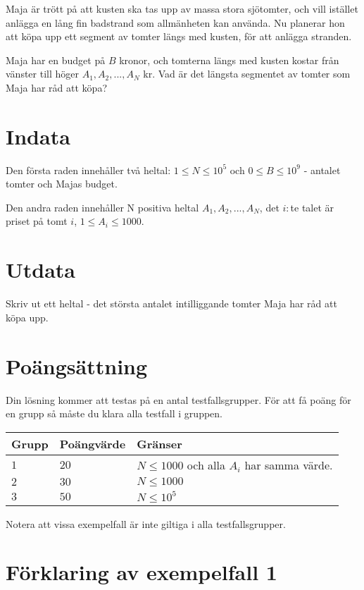 Maja är trött på att kusten ska tas upp av massa stora sjötomter, och vill istället anlägga en lång fin badstrand som allmänheten kan använda.
Nu planerar hon att köpa upp ett segment av tomter längs med kusten, för att anlägga stranden.

Maja har en budget på $B$ kronor, och tomterna längs med kusten kostar från vänster till höger $A_1,A_2,...,A_N$ kr.
Vad är det längsta segmentet av tomter som Maja har råd att köpa?

\section*{Indata}
Den första raden innehåller två heltal: $1\leq N \leq 10^5$ och $0 \leq B \leq 10^9$ - antalet tomter och Majas budget.

Den andra raden innehåller N positiva heltal $A_1,A_2,...,A_N$, det $i:$te talet är priset på tomt $i$, $1\le A_i \le 1000$.


\section*{Utdata}
Skriv ut ett heltal - det största antalet intilliggande tomter Maja har råd att köpa upp.

\section*{Poängsättning}
Din lösning kommer att testas på en antal testfallsgrupper.
För att få poäng för en grupp så måste du klara alla testfall i gruppen.

\noindent
\begin{tabular}{| l | l | p{12cm} |}
  \hline
  Grupp & Poängvärde & Gränser \\ \hline
  $1$   & $20$       & $N \leq 1000 $ och alla $A_i$ har samma värde.\\ \hline
  $2$   & $30$       & $N \leq 1000 $\\ \hline
  $3$   & $50$       & $N \leq 10^5 $  \\ \hline
\end{tabular}

Notera att vissa exempelfall är inte giltiga i alla testfallsgrupper.

\section*{Förklaring av exempelfall 1}
